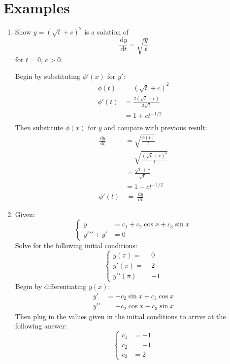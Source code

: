 \documentclass{article}
\newcommand{\ud}{\, \mathrm{d}}
\begin{document}
\section{Examples}
\begin{enumerate}
	\item Show $y = (\sqrt{t} + c)^2$ is a solution of 
		\begin{equation}
		\frac{\ud y}{\ud t} = \sqrt{\frac{y}{t}}
		\end{equation}
		for $t = 0$, $c > 0$.

		Begin by substituting $\phi\prime(x)$ for $y\prime$:
		\begin{align*}
		\phi(t) & = (\sqrt{t} + c)^2 \\
		\phi \prime(t) & = \frac{2(\sqrt{t} + c)}{2\sqrt{t}} \\
		& = 1 + ct^{-1/2} \\
		\end{align*}
		Then substitute $\phi(x)$ for $y$ and compare with previous result:
		\begin{align*}
		\frac{\ud y}{\ud t} & = \sqrt{\frac{\phi(t)}{t}} \\
		& = \sqrt{\frac{(\sqrt{t} + c)^2}{t}} \\
		& = \frac{\sqrt{t} + c}{\sqrt{t}} \\
		& = 1 + ct^{-1/2} \\
		\phi \prime(t) & \, \check{=} \, \frac{\ud y}{\ud t}
		\end{align*}
	\item Given:
		\begin{equation}
		\begin{cases}
		y & = c_1 + c_2\cos x + c_3\sin x \\[5pt]
		y\prime\prime\prime + y\prime & = 0
		\end{cases}
		\end{equation}
		Solve for the following initial conditions:
		\begin{equation*}
		\begin{cases}
		y(\pi) = & 0 \\
		y\prime(\pi) = & 2 \\
		y\prime\prime(\pi) = & -1
		\end{cases}
		\end{equation*}
		Begin by differentiating $y(x)$:
		\begin{align*}
		y\prime & = -c_2\sin x + c_3\cos x \\
		y\prime\prime & = -c_2\cos x - c_3\sin x
		\end{align*}
		Then plug in the values given in the initial conditions to arrive at the following answer:
		\[\begin{cases}
		c_1 & = -1 \\
		c_2 & = -1 \\
		c_3 & = 2
		\end{cases}\]
\end{enumerate}
\end{document}
